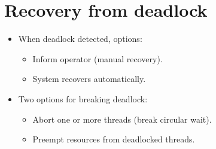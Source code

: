 \section{Recovery from deadlock}

\begin{itemize}
    \item When deadlock detected, options:
    \begin{itemize}
        \item Inform operator (manual recovery).
        \item System recovers automatically.
    \end{itemize}
    \item Two options for breaking deadlock:
    \begin{itemize}
        \item Abort one or more threads (break circular wait).
        \item Preempt resources from deadlocked threads.
    \end{itemize}
\end{itemize}

